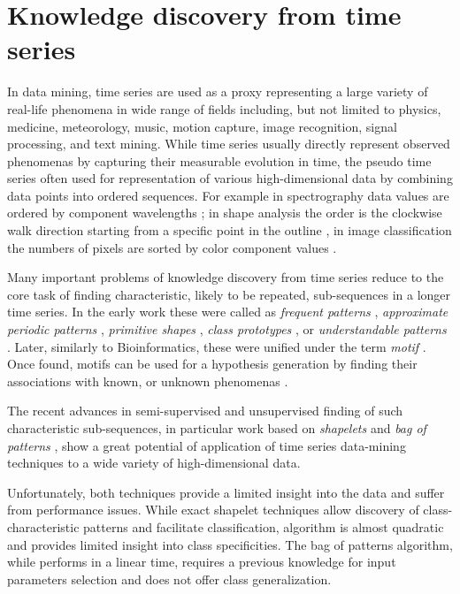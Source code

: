 \section{Knowledge discovery from time series}\label{section_knowledge_discovery}
In data mining, time series are used as a proxy representing a large variety of real-life phenomena 
in wide range of fields including, but not limited to physics, medicine, meteorology, 
music, motion capture, image recognition, signal processing, and text mining. 
While time series usually directly represent observed phenomenas by capturing their measurable evolution 
in time, the pseudo time series often used for representation of various high-dimensional data 
by combining data points into ordered sequences. 
For example in spectrography data values are ordered by component wavelengths \cite{citeulike:12550833};
in shape analysis the order is the clockwise walk direction starting from a
specific point in the outline \cite{citeulike:12550835}, in image classification the numbers of pixels
are sorted by color component values \cite{citeulike:2900542}.

Many important problems of knowledge discovery from time series reduce to the core task of finding 
characteristic, likely to be repeated, sub-sequences in a longer time series. 
In the early work these were called as 
\textit{frequent patterns} \cite{citeulike:5159615}, 
\textit{approximate periodic patterns} \cite{citeulike:1959582},
\textit{primitive shapes} \cite{citeulike:5898869}, 
\textit{class prototypes} \cite{citeulike:4406444}, 
or \textit{understandable patterns} \cite{citeulike:3978076}. 
Later, similarly to Bioinformatics, these were unified under the term \textit{motif} \cite{citeulike:3977965}.
Once found, motifs can be used for a hypothesis generation by finding their associations with known,
or unknown phenomenas \cite{citeulike:3977965}. 

The recent advances in semi-supervised and unsupervised finding of such characteristic sub-sequences, 
in particular work based on \textit{shapelets} \cite{citeulike:7344347} \cite{citeulike:11957982}
\cite{citeulike:12552293} and \textit{bag of patterns} \cite{citeulike:10525778}, show a great potential 
of application of time series data-mining techniques to a wide variety of high-dimensional data.

Unfortunately, both techniques provide a limited insight into the data and suffer from performance issues. 
While exact shapelet techniques allow discovery of class-characteristic patterns and facilitate classification,
algorithm is almost quadratic and provides limited insight into class specificities. 
The bag of patterns algorithm, while performs in a linear time, requires a previous knowledge for input parameters 
selection and does not offer class generalization.

